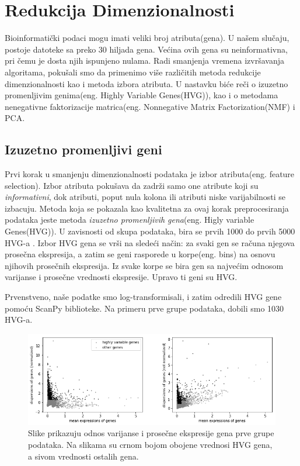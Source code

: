 \documentclass[a4paper]{article}
\begin{document}
\section{Redukcija Dimenzionalnosti}
Bioinformatički podaci mogu imati veliki broj atributa(gena). U našem slučaju, postoje datoteke sa preko $30$ hiljada gena. Većina ovih gena su neinformativna, pri čemu je dosta njih ispunjeno nulama. Radi smanjenja vremena izvršavanja algoritama, pokušali smo da primenimo više različitih metoda redukcije dimenzionalnosti kao i metoda izbora atributa. U nastavku biće reči o izuzetno promenljivim genima(eng. Highly Variable Genes(HVG)), kao i o metodama nenegativne faktorizacije matrica(eng. Nonnegative Matrix Factorization(NMF) i PCA.

\subsection{Izuzetno promenljivi geni}
Prvi korak u smanjenju dimenzionalnosti podataka je izbor atributa(eng. feature selection). Izbor atributa pokušava da zadrži samo one atribute koji su \textit{informativni}, dok atributi, poput nula kolona ili atributi niske varijabilnosti se izbacuju. Metoda koja se pokazala kao kvalitetna za ovaj korak preprocesiranja podataka jeste metoda \textit{izuzetno promenljivih gena}(eng. Higly variable Genes(HVG)). U zavisnosti od skupa podataka, bira se prvih 1000 do prvih 5000 HVG-a \cite{luecken2019current}. Izbor HVG gena se vrši na sledeći način: za svaki gen se računa njegova prosečna ekspresija, a zatim se geni rasporede u korpe(eng. bins) na osnovu njihovih prosečnih ekspresija. Iz svake korpe se bira gen sa najvećim odnosom varijanse i prosečne vrednosti ekspresije. Upravo ti geni su HVG.

Prvenstveno, naše podatke smo log-transformisali, i zatim odredili HVG gene pomoću ScanPy biblioteke. Na primeru prve grupe podataka, dobili smo 1030 HVG-a.


\begin{figure}[h!]
\centering
\includegraphics[scale=0.5]{hvg_izabrani}
\caption{Slike prikazuju odnos varijanse i prosečne ekspresije gena prve grupe podataka. Na slikama su crnom bojom obojene vrednosi HVG gena, a sivom vrednosti ostalih gena.}
\end{figure}
\end{document}
